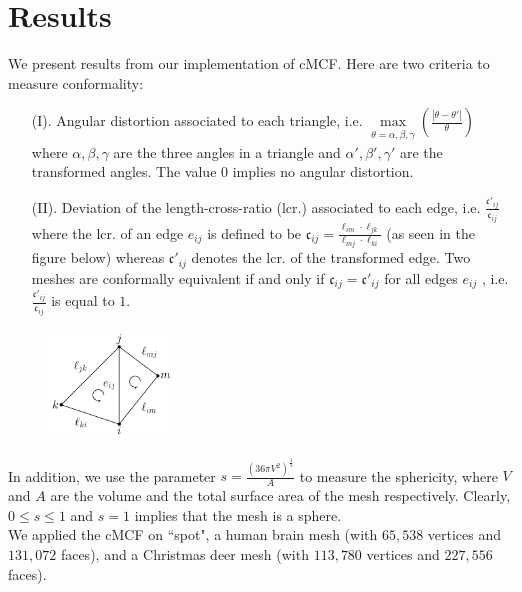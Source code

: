 \documentclass[11pt]{amsart}
\begin{document}
\section{Results} 
We present results from our implementation of cMCF. Here are two criteria to measure conformality:
\begin{enumerate}
\item[(I).] Angular distortion associated to each triangle, i.e. $\underset{\substack{\theta = \alpha, \beta, \gamma}}{\text{max}}\left(\frac{|\theta - \theta'|}{\theta}\right)$ where $ \alpha, \beta, \gamma$ are the three angles in a triangle and $ \alpha', \beta', \gamma'$ are the transformed angles. The value $0$ implies no angular distortion.
\item[(II).] Deviation of the length-cross-ratio (lcr.) associated to each edge, i.e. $\frac{\mathfrak{c}'_{ij}}{\mathfrak{c}_{ij}} $ where the lcr. of an edge $e_{ij}$ is defined to be $\mathfrak{c}_{ij} = \frac{\ell_{im} \cdot \ell_{jk}}{ \ell_{mj}\cdot \ell_{ki}}$ (as seen in  the figure below) whereas $\mathfrak{c}'_{ij}$ denotes the lcr. of the transformed edge. Two meshes are conformally equivalent if and only if $\mathfrak{c}_{ij} = \mathfrak{c}'_{ij}$ for all edges $e_{ij}$ \cite{ssp}, i.e.  $\frac{\mathfrak{c}'_{ij}}{\mathfrak{c}_{ij}} $ is equal to $1$.
\end{enumerate}
\begin{figure}
\centering
\includegraphics[width =0.3\textwidth]{crosslengthratio}
\end{figure} 
In addition, we use the parameter $s = \frac{\left( 36 \pi V^2 \right)^{\frac{1}{3}}}{A}$ to measure the sphericity, where $V$ and $A$ are the volume and the total surface area of the mesh respectively. Clearly, $0 \leq s \leq 1$ and $s = 1$ implies that the mesh is a sphere.\\
We applied the cMCF on ``spot", a human brain mesh (with $65,538$ vertices and $131,072$ faces), and a Christmas deer mesh (with $113,780$ vertices and $227,556$ faces).
\end{document}
